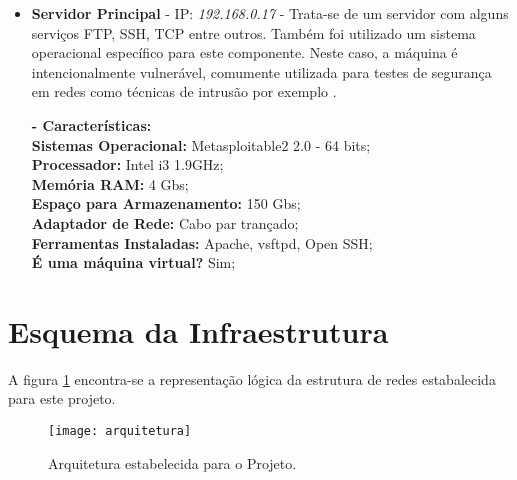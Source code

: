 \begin{itemize}
			\textbf{- Características:} \\
			\textbf{Sistemas Operacional:} Security Onion 12.04 - 64 bits; \\
			\textbf{Processador:} Intel i3 1.9GHz; \\
			\textbf{Memória RAM:} 4 Gbs; \\
			\textbf{Espaço para Armazenamento:} 150 Gbs; \\
			\textbf{Adaptador de Rede:} Cabo par trançado; \\
			\textbf{Ferramentas Instaladas:} Snort e Snorby; \\
			\textbf{É uma máquina virtual?} Não; \\

			\item \textbf{Servidor Principal} - IP: \emph{192.168.0.17} - Trata-se de um servidor com alguns serviços FTP, SSH, TCP entre outros. Também foi utilizado um sistema operacional específico para este componente. Neste caso, a máquina é intencionalmente vulnerável, comumente utilizada para testes de segurança em redes como técnicas de intrusão por exemplo \cite{metasploitable2}.

			\textbf{- Características:} \\
			\textbf{Sistemas Operacional:} Metasploitable2 2.0 - 64 bits; \\
			\textbf{Processador:} Intel i3 1.9GHz; \\
			\textbf{Memória RAM:} 4 Gbs; \\
			\textbf{Espaço para Armazenamento:} 150 Gbs; \\
			\textbf{Adaptador de Rede:} Cabo par trançado; \\
			\textbf{Ferramentas Instaladas:} Apache, vsftpd, Open SSH; \\
			\textbf{É uma máquina virtual?} Sim; \\

		\end{itemize}


	\section{Esquema da Infraestrutura}
	\label{sec:Arquitetura_Esquema_Infra}

		A figura \ref{fig:arquitetura} encontra-se a representação lógica da estrutura de redes estabalecida para este projeto.

		\begin{figure}[h]
			\centering
			\texttt{[image: arquitetura]}
			\caption{Arquitetura estabelecida para o Projeto.}
			\label{fig:arquitetura}
		\end{figure}

